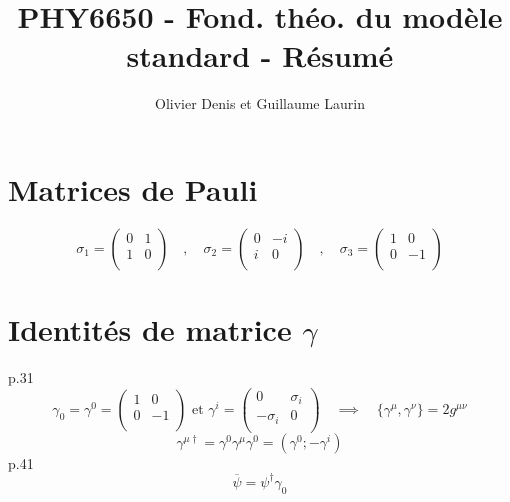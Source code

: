 \documentclass[12pt]{article}
\begin{document}
\title{PHY6650 - Fond. théo. du modèle standard - Résumé}
\author{Olivier Denis et Guillaume Laurin}
\maketitle
\newpage

\section{Matrices de Pauli}
\begin{equation}
    \sigma_1 = \begin{pmatrix} 0 & 1\\ 1 & 0\\ \end{pmatrix} \quad , \quad \sigma_2 = \begin{pmatrix} 0  & -i \\ i & 0\\ \end{pmatrix} \quad , \quad \sigma_3 = \begin{pmatrix} 1 & 0 \\ 0 & -1 \\ \end{pmatrix}
\end{equation}

\section{Identités de matrice $\gamma$}
p.31
\begin{equation}
  \gamma_0 = \gamma^0 = \begin{pmatrix}
    1 & 0 \\
    0 & -1\\
\end{pmatrix} \text{  et   } \gamma^i = \begin{pmatrix}
  0 & \sigma_i \\
  -\sigma_i & 0\\
\end{pmatrix} \quad \implies \quad \{\gamma^\mu, \gamma^\nu\} = 2 g^{\mu\nu}
\end{equation}
\begin{equation}
  \gamma^{\mu\dag} = \gamma^0 \gamma^\mu \gamma^0 = ( \gamma^0; -\gamma^i )
\end{equation}
\quad p.41
\begin{equation}
  \overline{\psi} = \psi^\dag\gamma_0
\end{equation}
\end{document}
